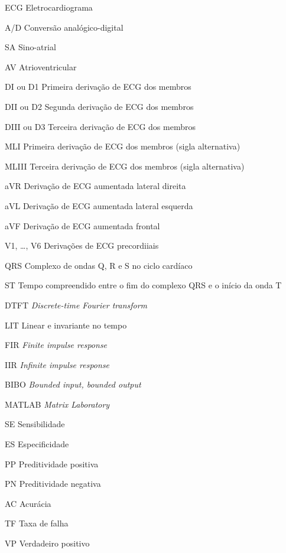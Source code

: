 
\begin{siglas}
    \item[ECG] Eletrocardiograma
    \item[A/D] Conversão analógico-digital
    \item[SA] Sino-atrial
    \item[AV] Atrioventricular
    \item[DI ou D1] Primeira derivação de ECG dos membros
    \item[DII ou D2] Segunda derivação de ECG dos membros
    \item[DIII ou D3] Terceira derivação de ECG dos membros
    \item[MLI] Primeira derivação de ECG dos membros (sigla alternativa)
    \item[MLIII] Terceira derivação de ECG dos membros (sigla alternativa)
    \item[aVR] Derivação de ECG aumentada lateral direita
    \item[aVL] Derivação de ECG aumentada lateral esquerda
    \item[aVF] Derivação de ECG aumentada frontal
    \item[V1, \ldots, V6] Derivações de ECG precordiiais
    \item[QRS] Complexo de ondas Q, R e S no ciclo cardíaco
    \item[ST] Tempo compreendido entre o fim do complexo QRS e o início da onda T
    \item[DTFT] \emph{Discrete-time Fourier transform}
    \item[LIT] Linear e invariante no tempo
    \item[FIR] \emph{Finite impulse response}
    \item[IIR] \emph{Infinite impulse response}
    \item[BIBO] \emph{Bounded input, bounded output}
    \item[MATLAB] \emph{Matrix Laboratory}
    \item[SE] Sensibilidade
    \item[ES] Especificidade
    \item[PP] Preditividade positiva
    \item[PN] Preditividade negativa
    \item[AC] Acurácia
    \item[TF] Taxa de falha
    \item[VP] Verdadeiro positivo

\end{siglas}
